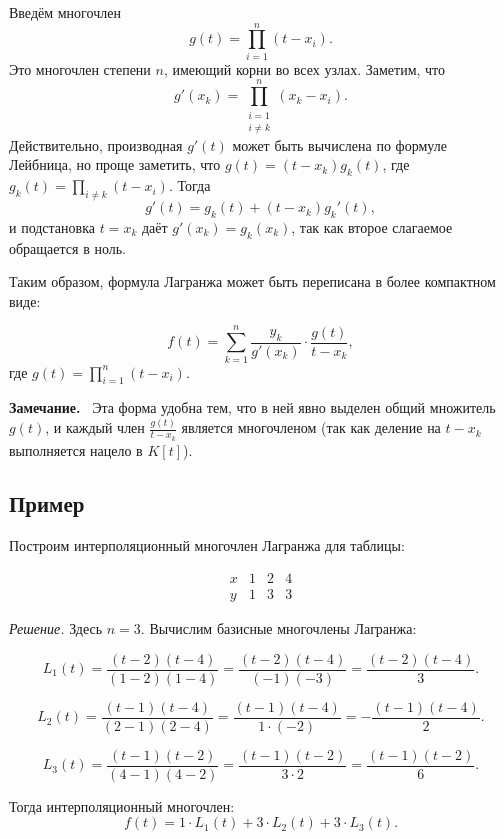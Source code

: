 \documentclass[a4paper,12pt]{article}
\newcommand{\myremark}{\textbf{Замечание.}\ }
\theoremstyle{definition}
\theoremstyle{plain}
\theoremstyle{remark}
\begin{document}
	Введём многочлен
	\[
	g(t) = \prod_{i=1}^n (t - x_i).
	\]
	Это многочлен степени \( n \), имеющий корни во всех узлах. Заметим, что
	\[
	g'(x_k) = \prod_{\substack{i=1 \\ i \neq k}}^n (x_k - x_i).
	\]
	Действительно, производная \( g'(t) \) может быть вычислена по формуле Лейбница, но проще заметить, что \( g(t) = (t - x_k) g_k(t) \), где \( g_k(t) = \prod_{i \neq k} (t - x_i) \). Тогда
	\[
	g'(t) = g_k(t) + (t - x_k) g_k'(t),
	\]
	и подстановка \( t = x_k \) даёт \( g'(x_k) = g_k(x_k) \), так как второе слагаемое обращается в ноль.
	
	Таким образом, формула Лагранжа может быть переписана в более компактном виде:
	
	\begin{tcolorbox}[colback=red!5, colframe=red!50!black, title=Компактная форма]
		\[
		f(t) = \sum_{k=1}^n \frac{y_k}{g'(x_k)} \cdot \frac{g(t)}{t - x_k},
		\]
		где \( g(t) = \prod_{i=1}^n (t - x_i) \).
	\end{tcolorbox}
	
	\myremark
	Эта форма удобна тем, что в ней явно выделен общий множитель \( g(t) \), и каждый член \( \frac{g(t)}{t - x_k} \) является многочленом (так как деление на \( t - x_k \) выполняется нацело в \( K[t] \)).
	
	\subsection{Пример}
	
	Построим интерполяционный многочлен Лагранжа для таблицы:
	
	\[
	\begin{array}{c|ccc}
		x & 1 & 2 & 4 \\
		\hline
		y & 1 & 3 & 3
	\end{array}
	\]
	
	\textit{Решение.} Здесь \( n = 3 \). Вычислим базисные многочлены Лагранжа:
	
	\[
	L_1(t) = \frac{(t-2)(t-4)}{(1-2)(1-4)} = \frac{(t-2)(t-4)}{(-1)(-3)} = \frac{(t-2)(t-4)}{3}.
	\]
	
	\[
	L_2(t) = \frac{(t-1)(t-4)}{(2-1)(2-4)} = \frac{(t-1)(t-4)}{1 \cdot (-2)} = -\frac{(t-1)(t-4)}{2}.
	\]
	
	\[
	L_3(t) = \frac{(t-1)(t-2)}{(4-1)(4-2)} = \frac{(t-1)(t-2)}{3 \cdot 2} = \frac{(t-1)(t-2)}{6}.
	\]
	
	Тогда интерполяционный многочлен:
	\[
	f(t) = 1 \cdot L_1(t) + 3 \cdot L_2(t) + 3 \cdot L_3(t).
	\]
	
\end{document}
